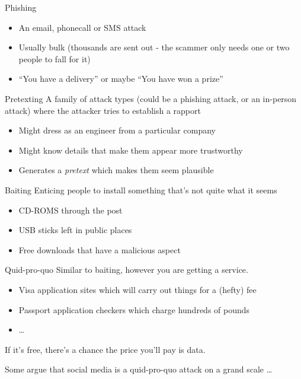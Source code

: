\documentclass[xcolor=table]{beamer}
\begin{document}
\begin{frame}{Phishing}
	\begin{itemize}
		\item An email, phonecall or SMS attack
		\item Usually bulk (thousands are sent out - the scammer only needs one or two people to fall for it)
		\item ``You have a delivery'' or maybe ``You have won a prize''
	\end{itemize}
\end{frame}

\begin{frame}{Pretexting}
	A family of attack types (could be a phishing attack, or an in-person attack) where the attacker tries to establish a rapport
	\begin{itemize}
		\item Might dress as an engineer from a particular company
		\item Might know details that make them appear more trustworthy
		\item Generates a \emph{pretext} which makes them seem plausible
	\end{itemize}


\end{frame}

\begin{frame}{Baiting}
	Enticing people to install something that's not quite what it seems
	\begin{itemize}
		\item CD-ROMS through the post
		\item USB sticks left in public places
		\item Free downloads that have a malicious aspect
	\end{itemize}
\end{frame}
\begin{frame}{Quid-pro-quo}
	Similar to baiting,  however you are getting a service.

	\begin{itemize}
		\item Visa application sites which will carry out things for a (hefty) fee
		\item Passport application checkers which charge hundreds of pounds 
		\item \ldots
	\end{itemize}

	If it's free, there's a chance the price you'll pay is data.

	\vspace{0.5em}


	Some argue that social media is a quid-pro-quo attack on a grand scale \ldots
\end{frame}
\end{document}
